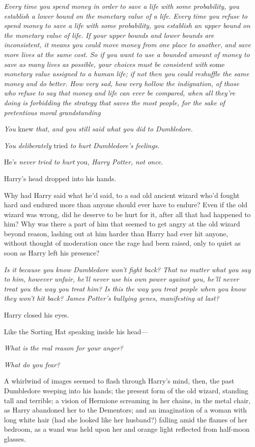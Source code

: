 \emph{Every time you spend money in order to save a life with some probability,
you establish a lower bound on the monetary value of a life. Every time you
refuse to spend money to save a life with some probability, you establish an
upper bound on the monetary value of life. If your upper bounds and lower
bounds are inconsistent, it means you could move money from one place to
another, and save more lives at the same cost. So if you want to use a bounded
amount of money to save as many lives as possible, your choices must be
consistent with} some \emph{monetary value assigned to a human life; if not
then you could reshuffle the same money and do better. How very sad, how very
hollow the indignation, of those who refuse to say that money and life can ever
be compared, when all they're doing is forbidding the strategy that saves the
most people, for the sake of pretentious moral grandstanding{\el}}

\emph{You} knew \emph{that, and you still said what you did to Dumbledore.}

\emph{You deliberately} tried \emph{to hurt Dumbledore's feelings.}

He's \emph{never tried to hurt} you, \emph{Harry Potter, not once.}

Harry's head dropped into his hands.

Why had Harry said what he'd said, to a sad old ancient wizard who'd fought
hard and endured more than anyone should ever have to endure? Even if the old
wizard was wrong, did he deserve to be hurt for it, after all that had happened
to him? Why was there a part of him that seemed to get angry at the old wizard
beyond reason, lashing out at him harder than Harry had ever hit anyone,
without thought of moderation once the rage had been raised, only to quiet as
soon as Harry left his presence?

\emph{Is it because you know Dumbledore won't fight back? That no matter what
you say to him, however unfair, he'll never use his own power against you,
he'll never treat you the way you treat him? Is this the way you treat people
when you know they won't hit back? James Potter's bullying genes, manifesting
at last?}

Harry closed his eyes.

Like the Sorting Hat speaking inside his head—

\emph{What is the real reason for your anger?}

\emph{What do you fear?}

A whirlwind of images seemed to flash through Harry's mind, then, the past
Dumbledore weeping into his hands; the present form of the old wizard, standing
tall and terrible; a vision of Hermione screaming in her chains, in the metal
chair, as Harry abandoned her to the Dementors; and an imagination of a woman
with long white hair (had she looked like her husband?) falling amid the flames
of her bedroom, as a wand was held upon her and orange light reflected from
half-moon glasses.

